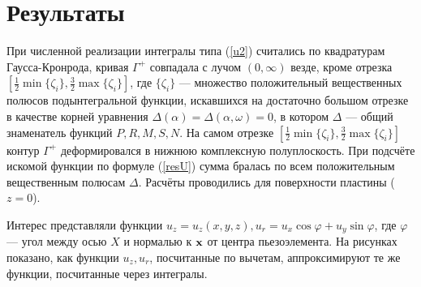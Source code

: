 \documentclass[a4paper, 12pt]{article}
\begin{document}
\section{Результаты}
При численной реализации интегралы типа (\ref{u2}) считались по квадратурам Гаусса-Кронрода,
кривая $\Gamma^+$ совпадала с лучом $(0,\infty)$ везде, кроме отрезка $[\frac{1}{2} \min \{\zeta_i\}, \frac{3}{2} \max \{\zeta_i\}]$,
где $\{\zeta_i \}$ --- множество положительный вещественных полюсов подынтегральной функции,
искавшихся на достаточно большом отрезке в качестве корней уравнения $\Delta(\alpha)=\Delta(\alpha,\omega)=0$, в котором $\Delta$ --- общий знаменатель функций $P,R,M,S,N$.
На самом отрезке $[\frac{1}{2} \min \{\zeta_i\}, \frac{3}{2} \max \{\zeta_i\}]$ контур $\Gamma^+$ деформировался в нижнюю комплексную полуплоскость.
При подсчёте искомой функции по формуле (\ref{resU}) сумма бралась по всем положительным вещественным полюсам $\Delta$.
Расчёты проводились для поверхности пластины ($z=0$).

Интерес представляли функции $u_z=u_z(x,y,z), u_r= u_x \cos \varphi + u_y \sin \varphi$,
где $\varphi$ --- угол между осью $X$ и нормалью к ${\bf x}$ от центра пьезоэлемента.
На рисунках показано, как функции $u_z, u_r$, посчитанные по вычетам, аппроксимируют те же функции, посчитанные через интегралы.
\end{document}
